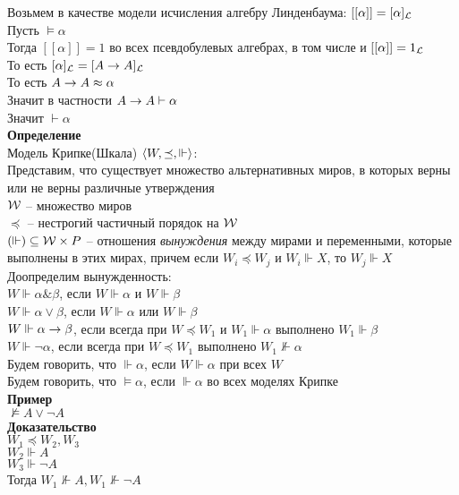 \documentclass[12pt]{article}
\begin{document}
Возьмем в качестве модели исчисления алгебру Линденбаума: $[[\alpha]] = [\alpha]_{\mathcal L}$\\
Пусть $\models \alpha$\\
Тогда $[[\alpha]] = 1$ во всех псевдобулевых алгебрах, в том числе и $[[\alpha]] = 1_{\mathcal L}$\\
То есть $[\alpha]_{\mathcal L} = [A\rightarrow A]_{\mathcal L}$\\
То есть $A\rightarrow A \approx \alpha$\\
Значит в частности $A \rightarrow A \vdash \alpha$\\
Значит $\vdash \alpha$\\
\textbf{Определение}\\
Модель Крипке(Шкала) $\langle W, \preceq, \Vdash\rangle$:\\
Представим, что существует множество альтернативных миров, в которых верны или не верны различные утверждения\\
$\mathcal W$ -- множество миров\\
$\preceq$ -- нестрогий частичный порядок на $\mathcal W$\\
$(\Vdash)\subseteq \mathcal W \times P$ -- отношения \textit{вынуждения} между мирами и переменными, которые выполнены в этих мирах, причем если $W_i \preceq W_j$ и $W_i \Vdash X$, то $W_j \Vdash X$\\
Доопределим вынужденность:\\
$W \Vdash \alpha \& \beta$, если $W \Vdash \alpha$ и $W \Vdash \beta$\\
$W \Vdash \alpha \lor \beta$, если $W \Vdash \alpha$ или $W \Vdash \beta$\\
$W \Vdash \alpha \rightarrow \beta$, если всегда при $W \preceq W_1$ и $W_1 \Vdash \alpha$ выполнено $W_1 \Vdash \beta$\\
$W \Vdash \lnot \alpha$, если всегда при $W \preceq W_1$ выполнено $W_1 \not\Vdash \alpha$\\
Будем говорить, что $\Vdash \alpha$, если $W \Vdash \alpha$ при всех $W$\\
Будем говорить, что $\models \alpha$, если $\Vdash \alpha$ во всех моделях Крипке\\
\textbf{Пример}\\
$\not\models A \lor \lnot A$\\
\textbf{Доказательство}\\
$W_1 \preceq W_2, W_3$\\
$W_2 \Vdash A$\\
$W_3 \Vdash \lnot A$\\
Тогда $W_1 \not\Vdash A, W_1 \not\Vdash \lnot A$\\
\end{document}
